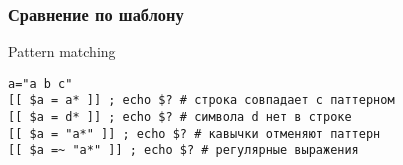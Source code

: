\begin{frame}[fragile]
    \frametitle{ Сравнение по шаблону}
    \begin{block}{ Pattern matching}
	\small\begin{lstlisting}
a="a b c"
[[ $a = a* ]] ; echo $? # строка совпадает с паттерном
[[ $a = d* ]] ; echo $? # символа d нет в строке
[[ $a = "a*" ]] ; echo $? # кaвычки отменяют паттерн
[[ $a =~ "a*" ]] ; echo $? # регулярные выражения
	\end{lstlisting}
    \end{block}
\end{frame}
